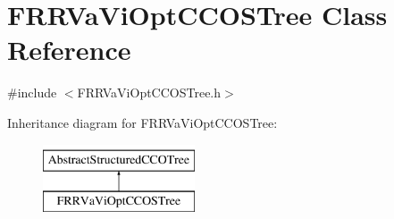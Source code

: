 \hypertarget{class_f_r_r_va_vi_opt_c_c_o_s_tree}{}\section{F\+R\+R\+Va\+Vi\+Opt\+C\+C\+O\+S\+Tree Class Reference}
\label{class_f_r_r_va_vi_opt_c_c_o_s_tree}


{\ttfamily \#include $<$F\+R\+R\+Va\+Vi\+Opt\+C\+C\+O\+S\+Tree.\+h$>$}

Inheritance diagram for F\+R\+R\+Va\+Vi\+Opt\+C\+C\+O\+S\+Tree\+:\begin{figure}[H]
\begin{center}
\leavevmode
\includegraphics[height=2.000000cm]{d9/dde/class_f_r_r_va_vi_opt_c_c_o_s_tree}
\end{center}
\end{figure}
